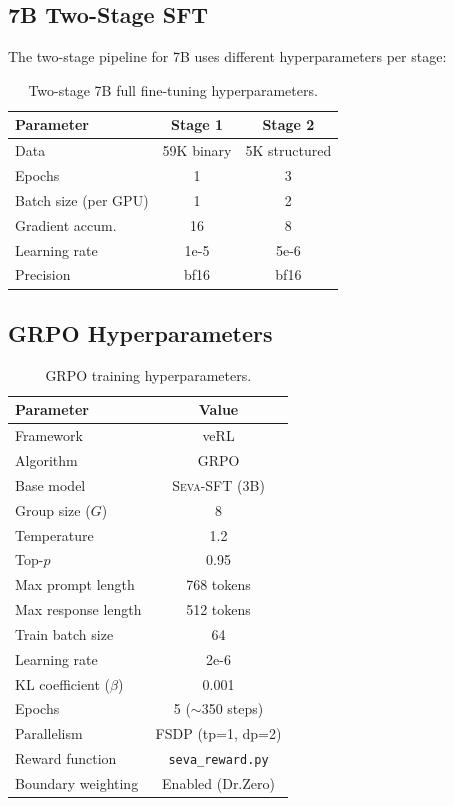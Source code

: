\documentclass[11pt]{article}
\newcommand{\seva}{\textsc{Seva}\xspace}
\begin{document}
\subsection{7B Two-Stage SFT}

The two-stage pipeline for 7B uses different hyperparameters per stage:

\begin{table}[h]
\centering
\small
\caption{Two-stage 7B full fine-tuning hyperparameters.}
\label{tab:twostage}
\begin{tabular}{lcc}
\toprule
\textbf{Parameter} & \textbf{Stage 1} & \textbf{Stage 2} \\
\midrule
Data & 59K binary & 5K structured \\
Epochs & 1 & 3 \\
Batch size (per GPU) & 1 & 2 \\
Gradient accum. & 16 & 8 \\
Learning rate & 1e-5 & 5e-6 \\
Precision & bf16 & bf16 \\
\bottomrule
\end{tabular}
\end{table}


\subsection{GRPO Hyperparameters}

\begin{table}[h]
\centering
\small
\caption{GRPO training hyperparameters.}
\label{tab:grpo_hyper}
\begin{tabular}{lc}
\toprule
\textbf{Parameter} & \textbf{Value} \\
\midrule
Framework & veRL \\
Algorithm & GRPO \\
Base model & \seva-SFT (3B) \\
Group size ($G$) & 8 \\
Temperature & 1.2 \\
Top-$p$ & 0.95 \\
Max prompt length & 768 tokens \\
Max response length & 512 tokens \\
Train batch size & 64 \\
Learning rate & 2e-6 \\
KL coefficient ($\beta$) & 0.001 \\
Epochs & 5 ($\sim$350 steps) \\
Parallelism & FSDP (tp=1, dp=2) \\
Reward function & \texttt{seva\_reward.py} \\
Boundary weighting & Enabled (Dr.Zero) \\
\bottomrule
\end{tabular}
\end{table}
\end{document}
